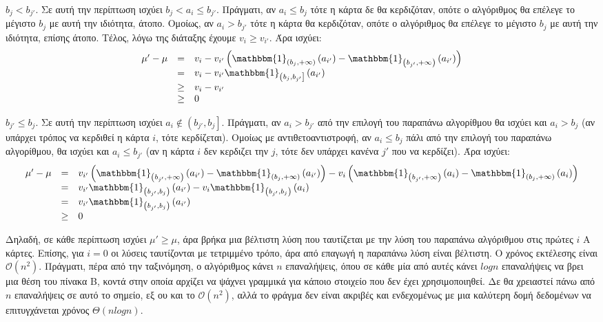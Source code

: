 \documentclass[12pt]{article}
\newcommand\bigOh{\mathcal{O}}
\newenvironment{b_item}{
\begin{itemize}
  \setlength{\itemsep}{0pt}
  \setlength{\parskip}{0pt}
  \setlength{\parsep}{0pt}
}{\end{itemize}}
\begin{document}
\begin{b_item}
\item$b_j<b_{j'}$. Σε αυτή την περίπτωση ισχύει $b_j<a_i\leq b_{j'}$. Πράγματι, αν $a_i\leq b_j$ τότε η κάρτα δε θα κερδιζόταν, οπότε ο αλγόριθμος θα επέλεγε το μέγιστο $b_j$ με αυτή την ιδιότητα, άτοπο. Ομοίως, αν $a_i>b_{j'}$ τότε η κάρτα θα κερδιζόταν, οπότε ο αλγόριθμος θα επέλεγε το μέγιστο $b_j$ με αυτή την ιδιότητα, επίσης άτοπο. Τέλος, λόγω της διάταξης έχουμε $v_i\geq v_{i'}$. Άρα ισχύει:
$$\begin{array}{rcl}\mu'-\mu
&=&v_i-v_{i'}\left(\mathbbm{1}_{\left(b_j,+\infty\right)}\left(a_{i'}\right)-\mathbbm{1}_{\left(b_{j'},+\infty\right)}\left(a_{i'}\right)\right)\\
&=&v_i-v_{i'}\mathbbm{1}_{\left(b_j,b_{j'}\right]}\left(a_{i'}\right)\\
&\geq&v_i-v_{i'}\\
&\geq&0\\
\end{array}$$
\item$b_{j'}\leq b_j$. Σε αυτή την περίπτωση ισχύει $a_i\notin\left(b_{j'},b_j\right]$. Πράγματι, αν $a_i>b_{j'}$ από την επιλογή του παραπάνω αλγορίθμου θα ισχύει και $a_i>b_j$ (αν υπάρχει τρόπος να κερδιθεί η κάρτα $i$, τότε κερδίζεται). Ομοίως με αντιθετοαντιστροφή, αν $a_i\leq b_j$ πάλι από την επιλογή του παραπάνω αλγορίθμου, θα ισχύει και $a_i\leq b_{j'}$ (αν η κάρτα $i$ δεν κερδιζει την $j$, τότε δεν υπάρχει κανένα $j'$ που να κερδίζει). Άρα ισχύει:
$$\begin{array}{rcl}\mu'-\mu
&=&v_{i'}\left(\mathbbm{1}_{\left(b_{j'},+\infty\right)}\left(a_{i'}\right)-\mathbbm{1}_{\left(b_j,+\infty\right)}\left(a_{i'}\right)\right)-v_i\left(\mathbbm{1}_{\left(b_{j'},+\infty\right)}\left(a_i\right)-\mathbbm{1}_{\left(b_j,+\infty\right)}\left(a_i\right)\right)\\
&=&v_{i'}\mathbbm{1}_{\left(b_{j'},b_j\right)}\left(a_{i'}\right)-v_i\mathbbm{1}_{\left(b_{j'},b_j\right)}\left(a_i\right)\\
&=&v_{i'}\mathbbm{1}_{\left(b_{j'},b_j\right)}\left(a_{i'}\right)\\
&\geq&0\\
\end{array}$$
\end{b_item}
Δηλαδή, σε κάθε περίπτωση ισχύει $\mu'\geq\mu$, άρα βρήκα μια βέλτιστη λύση που ταυτίζεται με την λύση του παραπάνω αλγόριθμου στις πρώτες $i$ Α κάρτες. Επίσης, για $i=0$ οι λύσεις ταυτίζονται με τετριμμένο τρόπο, άρα από επαγωγή η παραπάνω λύση είναι βέλτιστη. Ο χρόνος εκτέλεσης είναι $\bigOh\left(n^2\right)$. Πράγματι, πέρα από την ταξινόμηση, ο αλγόριθμος κάνει $n$ επαναλήψεις, όπου σε κάθε μία από αυτές κάνει $logn$ επαναλήψεις να βρει μια θέση του πίνακα Β, κοντά στην οποία αρχίζει να ψάχνει γραμμικά για κάποιο στοιχείο που δεν έχει χρησιμοποιηθεί. Δε θα χρειαστεί πάνω από $n$ επαναλήψεις σε αυτό το σημείο, εξ ου και το $\bigOh\left(n^2\right)$, αλλά το φράγμα δεν είναι ακριβές και ενδεχομένως με μια καλύτερη δομή δεδομένων να επιτυγχάνεται χρόνος $\Theta\left(nlogn\right)$.\\
\end{document}
